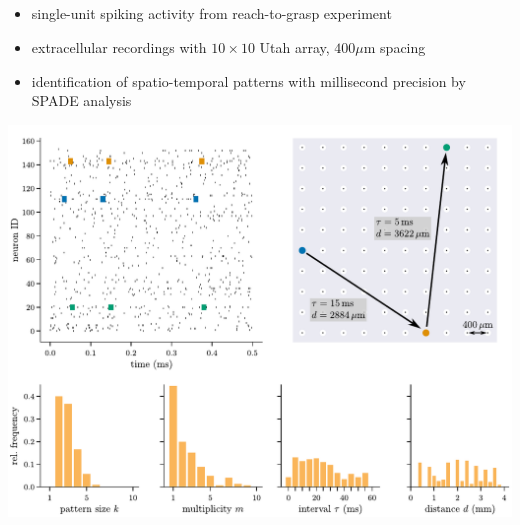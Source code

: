 \documentclass[8pt,t,usepdftitle=false]{beamer}
\begin{document}
\subsection{\sttl}
\begin{frame}[plain]
  \frametitle{\sttl}
  \begin{itemize}
  \item single-unit spiking activity from reach-to-grasp experiment 
    {\tiny\color{gray}\parencite{Riehle13_48}}
  \item extracellular recordings with $10\times{}10$ Utah array, $400\mu\text{m}$ spacing
  \item identification of spatio-temporal patterns with millisecond precision by SPADE analysis\\
    {\tiny\color{gray}\parencite{Torre13_132,Stella19_104022}}
  \end{itemize}
  \begin{center}
    \parbox{0.7\linewidth}{
      \includegraphics[width=\linewidth]{./figures/graphical_abstract_part_1_mod.pdf}\\
    }    
  \end{center}
\end{frame}
\def\sttl{Cell-assembly structure and detectability}
\end{document}
